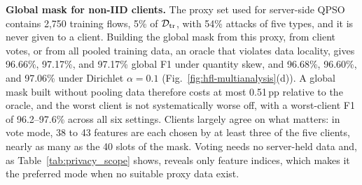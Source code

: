\documentclass[conference]{IEEEtran}
\begin{document}
\textbf{Global mask for non-IID clients.}
The proxy set used for server-side QPSO contains 2{,}750 training
flows, 5\% of $\mathcal{D}_{\rm tr}$, with 54\% attacks of five types,
and it is never given to a client. Building the global mask from this
proxy, from client votes, or from all pooled training data, an oracle
that violates data locality, gives 96.66\%, 97.17\%, and 97.17\%
global F1 under quantity skew, and 96.68\%, 96.60\%, and 97.06\% under
Dirichlet $\alpha=0.1$ (Fig.~\ref{fig:hfl-multianalysis}(d)). A
global mask built without pooling data therefore costs at most
0.51\,pp relative to the oracle, and the worst client is not
systematically worse off, with a worst-client F1 of 96.2--97.6\%
across all six settings. Clients largely agree on what matters: in
vote mode, 38 to 43 features are each chosen by at least three of the
five clients, nearly as many as the 40 slots of the mask. Voting needs no server-held data and,
as Table~\ref{tab:privacy_scope} shows, reveals only feature indices,
which makes it the preferred mode when no suitable proxy data exist.
\end{document}
